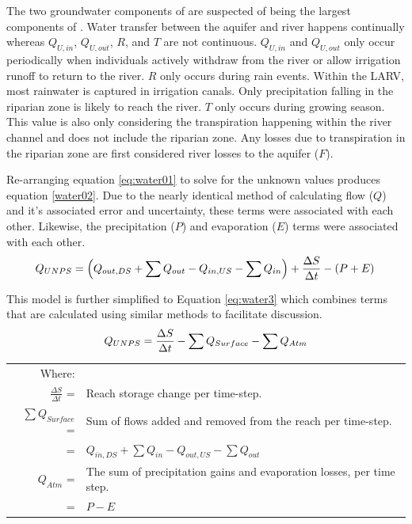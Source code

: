 \begin{linenumbers}
The two groundwater components of \Qnps are suspected of being the largest components of \Qnps.  Water transfer between the aquifer and river happens continually whereas $ Q_{U,in} $, $ Q_{U,out} $, $ R $, and $ T $ are not continuous.  $ Q_{U,in} $ and $ Q_{U,out} $ only occur periodically when individuals actively withdraw from the river or allow irrigation runoff to return to the river.  $ R $ only occurs during rain events.  Within the LARV, most rainwater is captured in irrigation canals.  Only precipitation falling in the riparian zone is likely to reach the river.  $ T $ only occurs during growing season.  This value is also only considering the transpiration happening within the river channel and does not include the riparian zone.  Any losses due to transpiration in the riparian zone are first considered river losses to the aquifer ($ F $).

Re-arranging equation \eqref{eq:water01} to solve for the unknown values produces equation \ref{water02}.  Due to the nearly identical method of calculating flow ($ Q $) and it's associated error and uncertainty, these terms were associated with each other.  Likewise, the precipitation ($ P $) and evaporation ($ E $) terms were associated with each other.
\begin{equation}
	\label{eq:water2}
	Q_{UNPS} = \left( Q_{out,DS} + \sum Q_{out} - Q_{in,US} - \sum Q_{in} \right) + \frac{\Delta S}{\Delta t} - \left( P + E \right)\\ 
\end{equation}

This model is further simplified to Equation \ref{eq:water3} which combines terms that are calculated using similar methods to facilitate discussion.
\begin{equation}
	\label{eq:water3}
	Q_{UNPS} = \frac{\Delta S}{\Delta t} - \sum Q_{Surface} - \sum Q_{Atm}\\ 
\end{equation}
\begin{tabular}{r p{5.5in}}
	Where:&\\
	$ \displaystyle \frac{\Delta S}{\Delta t} $ = & Reach storage change per time-step.\\
	$ \displaystyle \sum Q_{Surface} $ = & Sum of flows added and removed from the reach per time-step. \\
		= & $ Q_{in,DS} + \sum Q_{in} - Q_{out,US} - \sum Q_{out} $\\
	$ Q_{Atm} $ = & The sum of precipitation gains and evaporation losses, per time step.\\
		= & $ P - E $\\
\end{tabular}\\


\end{linenumbers}
